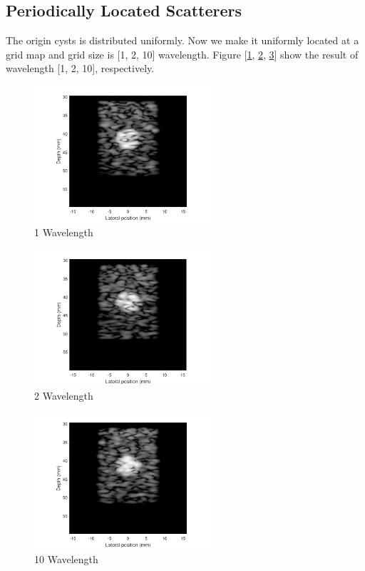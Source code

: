 \documentclass{article}
\begin{document}
\subsection{Periodically Located Scatterers}
The origin cysts is distributed uniformly. Now we make it uniformly located at a grid map and grid size is [1, 2, 10] wavelength.
Figure [\ref{fig:wave-1}, \ref{fig:wave-2}, \ref{fig:wave-10}] show the result of wavelength [1, 2, 10], respectively.
\begin{figure}[H]
	\centering
	\includegraphics[width = 0.6\textwidth]{src/wave_1.pdf}
	\caption{1 Wavelength}
	\label{fig:wave-1}
\end{figure}
\begin{figure}[H]
	\centering
	\includegraphics[width = 0.6\textwidth]{src/wave_2.pdf}
	\caption{2 Wavelength}
	\label{fig:wave-2}
\end{figure}
\begin{figure}[H]
	\centering
	\includegraphics[width = 0.6\textwidth]{src/wave_10.pdf}
	\caption{10 Wavelength}
	\label{fig:wave-10}
\end{figure}
\end{document}
